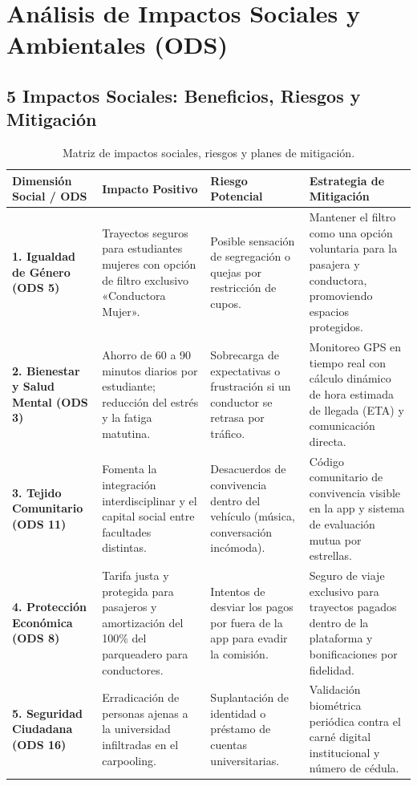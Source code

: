 \documentclass[11pt,a4paper]{article}
\begin{document}
\section{Análisis de Impactos Sociales y Ambientales (ODS)}

\subsection{5 Impactos Sociales: Beneficios, Riesgos y Mitigación}

\begin{table}[h!]
\centering
\scriptsize
\begin{tabularx}{\textwidth}{p{3.2cm} p{4.2cm} p{3.5cm} X}
\toprule
\textbf{Dimensión Social / ODS} & \textbf{Impacto Positivo} & \textbf{Riesgo Potencial} & \textbf{Estrategia de Mitigación} \\
\midrule
\textbf{1. Igualdad de Género (ODS 5)} & Trayectos seguros para estudiantes mujeres con opción de filtro exclusivo «Conductora Mujer». & Posible sensación de segregación o quejas por restricción de cupos. & Mantener el filtro como una opción voluntaria para la pasajera y conductora, promoviendo espacios protegidos. \\
\midrule
\textbf{2. Bienestar y Salud Mental (ODS 3)} & Ahorro de 60 a 90 minutos diarios por estudiante; reducción del estrés y la fatiga matutina. & Sobrecarga de expectativas o frustración si un conductor se retrasa por tráfico. & Monitoreo GPS en tiempo real con cálculo dinámico de hora estimada de llegada (ETA) y comunicación directa. \\
\midrule
\textbf{3. Tejido Comunitario (ODS 11)} & Fomenta la integración interdisciplinar y el capital social entre facultades distintas. & Desacuerdos de convivencia dentro del vehículo (música, conversación incómoda). & Código comunitario de convivencia visible en la app y sistema de evaluación mutua por estrellas. \\
\midrule
\textbf{4. Protección Económica (ODS 8)} & Tarifa justa y protegida para pasajeros y amortización del 100\% del parqueadero para conductores. & Intentos de desviar los pagos por fuera de la app para evadir la comisión. & Seguro de viaje exclusivo para trayectos pagados dentro de la plataforma y bonificaciones por fidelidad. \\
\midrule
\textbf{5. Seguridad Ciudadana (ODS 16)} & Erradicación de personas ajenas a la universidad infiltradas en el carpooling. & Suplantación de identidad o préstamo de cuentas universitarias. & Validación biométrica periódica contra el carné digital institucional y número de cédula. \\
\bottomrule
\end{tabularx}
\caption{Matriz de impactos sociales, riesgos y planes de mitigación.}
\end{table}
\end{document}
